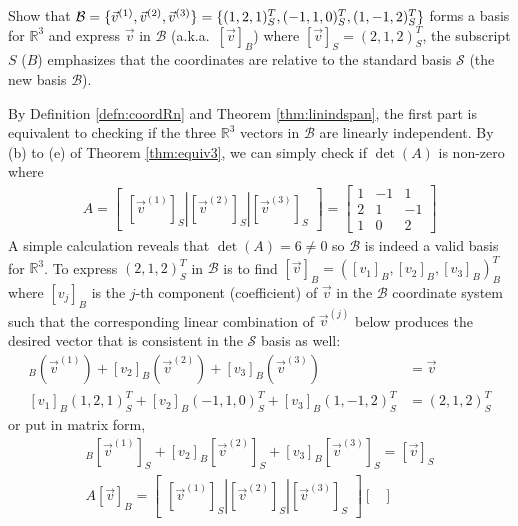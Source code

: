 \begin{exmp}
\label{exmp:basisR3}
Show that $\mathcal{B} = \{\vec{v}^{(1)}, \vec{v}^{(2)}, \vec{v}^{(3)}\} = \{(1,2,1)_S^T, (-1,1,0)_S^T, \\ (1,-1,2)_S^T\}$ forms a basis for $\mathbb{R}^3$ and express $\vec{v}$ in $\mathcal{B}$ (a.k.a.\ $[\vec{v}]_B$) where $[\vec{v}]_S = (2,1,2)_S^T$, the subscript $S$ ($B$) emphasizes that the coordinates are relative to the standard basis $\mathcal{S}$ (the new basis $\mathcal{B}$).
\end{exmp}
\begin{solution}
By Definition \ref{defn:coordRn} and Theorem \ref{thm:linindspan}, the first part is equivalent to checking if the three $\mathbb{R}^3$ vectors in $\mathcal{B}$ are linearly independent. By (b) to (e) of Theorem \ref{thm:equiv3}, we can simply check if $\det(A)$ is non-zero where 
\begin{align*}
A = \begin{bmatrix}[\vec{v}^{(1)}]_S|[\vec{v}^{(2)}]_S|[\vec{v}^{(3)}]_S
\end{bmatrix} =
\begin{bmatrix}
1 & -1 & 1 \\
2 & 1 & -1 \\
1 & 0 & 2
\end{bmatrix}
\end{align*}
A simple calculation reveals that $\det(A) = 6 \neq 0$ so $\mathcal{B}$ is indeed a valid basis for $\mathbb{R}^3$. To express $(2,1,2)_S^T$ in $\mathcal{B}$ is to find $[\vec{v}]_B = ([v_1]_B, [v_2]_B, [v_3]_B)_B^T$ where $[v_j]_B$ is the $j$-th component (coefficient) of $\vec{v}$ in the $\mathcal{B}$ coordinate system such that the corresponding linear combination of $\vec{v}^{(j)}$ below produces the desired vector that is consistent in the $\mathcal{S}$ basis as well:
\begin{align*}
[v_1]_B(\vec{v}^{(1)}) + [v_2]_B(\vec{v}^{(2)}) + [v_3]_B(\vec{v}^{(3)}) &= \vec{v} \\
[v_1]_B(1,2,1)_S^T + [v_2]_B(-1,1,0)_S^T + [v_3]_B(1,-1,2)_S^T &= (2,1,2)_S^T \end{align*}
or put in matrix form,
\begin{align*}
[v_1]_B[\vec{v}^{(1)}]_S + [v_2]_B[\vec{v}^{(2)}]_S + [v_3]_B[\vec{v}^{(3)}]_S = [\vec{v}]_S \\
A[\vec{v}]_B = \begin{bmatrix}[\vec{v}^{(1)}]_S|[\vec{v}^{(2)}]_S|[\vec{v}^{(3)}]_S
\end{bmatrix}\begin{bmatrix}

\end{bmatrix}
\end{align*}
\end{solution}
